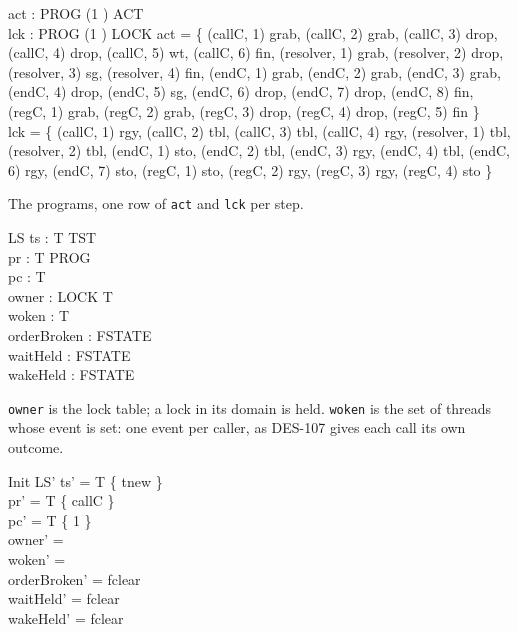 \documentclass[a4paper,10pt,fleqn]{article}
\begin{document}
\begin{axdef}
  act : PROG \cross (1 ) \pfun ACT \\
  lck : PROG \cross (1 ) \pfun LOCK
\where
  act = \{ (callC, 1) \mapsto grab, (callC, 2) \mapsto grab,
    (callC, 3) \mapsto drop, (callC, 4) \mapsto drop, (callC, 5) \mapsto wt,
    (callC, 6) \mapsto fin,
    (resolver, 1) \mapsto grab, (resolver, 2) \mapsto drop,
    (resolver, 3) \mapsto sg, (resolver, 4) \mapsto fin,
    (endC, 1) \mapsto grab, (endC, 2) \mapsto grab, (endC, 3) \mapsto grab,
    (endC, 4) \mapsto drop, (endC, 5) \mapsto sg, (endC, 6) \mapsto drop,
    (endC, 7) \mapsto drop, (endC, 8) \mapsto fin,
    (regC, 1) \mapsto grab, (regC, 2) \mapsto grab, (regC, 3) \mapsto drop,
    (regC, 4) \mapsto drop, (regC, 5) \mapsto fin \} \\
  lck = \{ (callC, 1) \mapsto rgy, (callC, 2) \mapsto tbl,
    (callC, 3) \mapsto tbl, (callC, 4) \mapsto rgy,
    (resolver, 1) \mapsto tbl, (resolver, 2) \mapsto tbl,
    (endC, 1) \mapsto sto, (endC, 2) \mapsto tbl, (endC, 3) \mapsto rgy,
    (endC, 4) \mapsto tbl, (endC, 6) \mapsto rgy, (endC, 7) \mapsto sto,
    (regC, 1) \mapsto sto, (regC, 2) \mapsto rgy, (regC, 3) \mapsto rgy,
    (regC, 4) \mapsto sto \}
\end{axdef}

The programs, one row of \texttt{act} and \texttt{lck} per step.

\begin{schema}{LS}
  ts : T \fun TST \\
  pr : T \fun PROG \\
  pc : T   \\
  owner : LOCK \pfun T \\
  woken : \power T \\
  orderBroken : FSTATE \\
  waitHeld : FSTATE \\
  wakeHeld : FSTATE
\end{schema}

\texttt{owner} is the lock table; a lock in its domain is held.
\texttt{woken} is the set of threads whose event is set: one event per
caller, as DES-107 gives each call its own outcome.

\begin{schema}{Init}
  LS'
\where
  ts' = T \cross \{ tnew \} \\
  pr' = T \cross \{ callC \} \\
  pc' = T \cross \{ 1 \} \\
  owner' = \emptyset \\
  woken' = \emptyset \\
  orderBroken' = fclear \\
  waitHeld' = fclear \\
  wakeHeld' = fclear
\end{schema}
\end{document}
